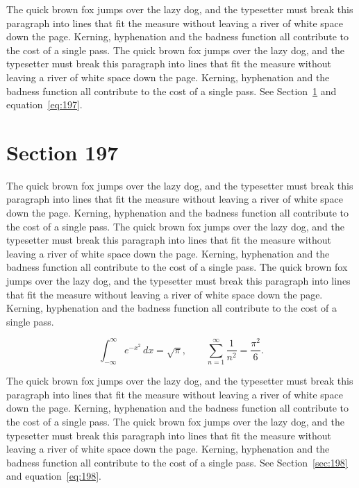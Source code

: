\documentclass{article}
\begin{document}
The quick brown fox jumps over the lazy dog, and the typesetter must break this paragraph into lines that fit the measure without leaving a river of white space down the page. Kerning, hyphenation and the badness function all contribute to the cost of a single pass. The quick brown fox jumps over the lazy dog, and the typesetter must break this paragraph into lines that fit the measure without leaving a river of white space down the page. Kerning, hyphenation and the badness function all contribute to the cost of a single pass. 
See Section~\ref{sec:197} and equation~\eqref{eq:197}.
\section{Section 197}
\label{sec:197}
The quick brown fox jumps over the lazy dog, and the typesetter must break this paragraph into lines that fit the measure without leaving a river of white space down the page. Kerning, hyphenation and the badness function all contribute to the cost of a single pass. The quick brown fox jumps over the lazy dog, and the typesetter must break this paragraph into lines that fit the measure without leaving a river of white space down the page. Kerning, hyphenation and the badness function all contribute to the cost of a single pass. The quick brown fox jumps over the lazy dog, and the typesetter must break this paragraph into lines that fit the measure without leaving a river of white space down the page. Kerning, hyphenation and the badness function all contribute to the cost of a single pass. 

\begin{equation}\label{eq:197}
\int_{-\infty}^{\infty} e^{-x^{2}}\,dx = \sqrt{\pi}, \qquad
\sum_{n=1}^{\infty} \frac{1}{n^{2}} = \frac{\pi^{2}}{6}.
\end{equation}

The quick brown fox jumps over the lazy dog, and the typesetter must break this paragraph into lines that fit the measure without leaving a river of white space down the page. Kerning, hyphenation and the badness function all contribute to the cost of a single pass. The quick brown fox jumps over the lazy dog, and the typesetter must break this paragraph into lines that fit the measure without leaving a river of white space down the page. Kerning, hyphenation and the badness function all contribute to the cost of a single pass. 
See Section~\ref{sec:198} and equation~\eqref{eq:198}.
\end{document}

